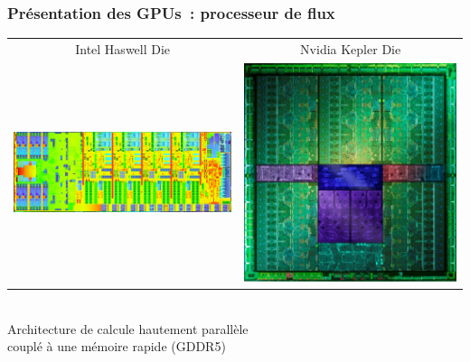\begin{frame}
  \frametitle{Présentation des GPUs~: processeur de flux}
  \begin{center}
    \begin{tabular}{cc}
      Intel Haswell Die & Nvidia Kepler Die \\[5mm]
      \includegraphics[height=.3\textheight]{images/intel-haswell-die.jpg} &
      \includegraphics[height=.3\textheight]{images/nvidia-kepler-die.jpg}
    \end{tabular} \\[5mm]
    Architecture de calcule hautement parallèle \\
    couplé à une mémoire rapide (GDDR5)
  \end{center}
\end{frame}

